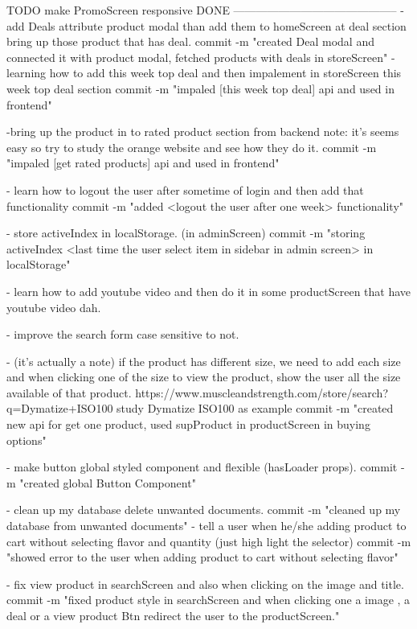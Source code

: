 TODO  make PromoScreen responsive
DONE
--------------------------------------------
- add Deals attribute product modal than add them to homeScreen 
       at deal section bring up those product that has deal.
       commit -m "created Deal modal and connected it with product modal, fetched products with deals in 
       storeScreen"
- learning how to add this week top deal and then impalement in storeScreen this week top deal section
      commit -m "impaled [this week top deal] api and used in frontend"

-bring up the product in to rated product section from backend 
      note: it's seems easy so try to study the orange website and see how they do it.
      commit -m "impaled [get rated products] api and used in frontend"

-   learn how to logout the user after sometime of login and 
            then add that functionality
      commit -m "added <logout the user after one week> functionality"

- store activeIndex in localStorage. (in adminScreen)
      commit -m "storing activeIndex <last time the user select item in sidebar in admin screen> in localStorage"

- learn how to add youtube video and then do it in some 
      productScreen that have youtube video dah.

- improve the search form case sensitive to not.

-  (it's actually a note) if the product has different size, 
      we need to add each size and when
      clicking one of the size to view the product, show the 
      user all the size available of that product.
      https://www.muscleandstrength.com/store/search?q=Dymatize+ISO100
      study Dymatize ISO100 as example
      commit -m "created new api for get one product, used supProduct in productScreen in buying options"

-   make button global styled component and flexible 
      (hasLoader props).
      commit -m "created global Button Component"

- clean up my database delete unwanted documents.
      commit -m "cleaned up my database from unwanted documents"
-  tell a user when he/she adding product to cart without 
selecting flavor and quantity (just high light the selector)
      commit -m "showed error to the user when adding product to cart without selecting flavor"

-   fix view product in searchScreen and also when clicking on the image and title.
      commit -m "fixed product style in searchScreen and when clicking one a image , a deal or a view product Btn redirect the user to the productScreen."

